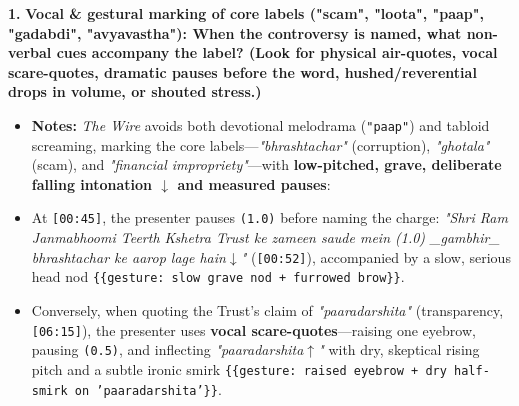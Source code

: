 \documentclass[10pt,a4paper]{article}
\begin{document}
\noindent\textbf{1.} \textbf{Vocal \& gestural marking of core labels ("scam", "loota", "paap", "gadabdi", "avyavastha"): When the controversy is named, what non-verbal cues accompany the label? (Look for physical air-quotes, vocal scare-quotes, dramatic pauses before the word, hushed/reverential drops in volume, or shouted stress.)}\par\smallskip
\begin{itemize}
  \item \textbf{Notes:}
\textit{The Wire} avoids both devotional melodrama (\texttt{"paap"}) and tabloid screaming, marking the core labels---\textit{"bhrashtachar"} (corruption), \textit{"ghotala"} (scam), and \textit{"financial impropriety"}---with \textbf{low-pitched, grave, deliberate falling intonation \texttt{$\downarrow$} and measured pauses}:\par\smallskip
  \item At \texttt{[00:45]}, the presenter pauses \texttt{(1.0)} before naming the charge: \textit{"Shri Ram Janmabhoomi Teerth Kshetra Trust ke zameen saude mein (1.0) \_gambhir\_ bhrashtachar ke aarop lage hain$\downarrow$"} (\texttt{[00:52]}), accompanied by a slow, serious head nod \texttt{\{\{gesture: slow grave nod + furrowed brow\}\}}.
  \item Conversely, when quoting the Trust's claim of \textit{"paaradarshita"} (transparency, \texttt{[06:15]}), the presenter uses \textbf{vocal scare-quotes}---raising one eyebrow, pausing \texttt{(0.5)}, and inflecting \textit{"paaradarshita$\uparrow$"} with dry, skeptical rising pitch and a subtle ironic smirk \texttt{\{\{gesture: raised eyebrow + dry half-smirk on 'paaradarshita'\}\}}.
\end{itemize}
\end{document}

